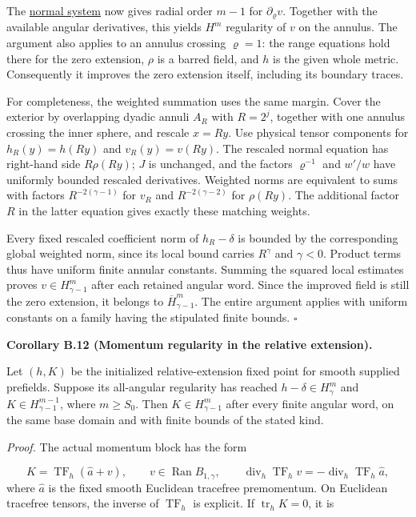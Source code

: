 \documentclass[
  english,
  11pt,
  reqno]{amsart}
\makeatletter
\newcommand{\pandocstatementheading}[1]{%
  \par\addpenalty{\@beginparpenalty}%
  \addvspace{.5\baselineskip plus .2\baselineskip minus .2\baselineskip}%
  {\normalfont\bfseries #1\par}%
  \nobreak\@afterindenttrue\@afterheading
}
\makeatother
\begin{document}
The \hyperref[eq:online-extension-momentum-normal-system]{normal system}
now gives radial order \(m-1\) for \(\partial_\varrho v\). Together with
the available angular derivatives, this yields \(H^m\) regularity of
\(v\) on the annulus. The argument also applies to an annulus crossing
\(\varrho=1\): the range equations hold there for the zero extension,
\(\rho\) is a barred field, and \(h\) is the given whole metric.
Consequently it improves the zero extension itself, including its
boundary traces.

For completeness, the weighted summation uses the same margin. Cover the
exterior by overlapping dyadic annuli \(A_R\) with \(R=2^j\), together
with one annulus crossing the inner sphere, and rescale \(x=Ry\). Use
physical tensor components for \(h_R(y)=h(Ry)\) and \(v_R(y)=v(Ry)\).
The rescaled normal equation has right-hand side \(R\rho(Ry)\); \(J\) is
unchanged, and the factors \(\varrho^{-1}\) and \(w'/w\) have uniformly
bounded rescaled derivatives. Weighted norms are equivalent to sums with
factors \(R^{-2(\gamma-1)}\) for \(v_R\) and \(R^{-2(\gamma-2)}\) for
\(\rho(Ry)\). The additional factor \(R\) in the latter equation gives
exactly these matching weights.

Every fixed rescaled coefficient norm of \(h_R-\delta\) is bounded by
the corresponding global weighted norm, since its local bound carries
\(R^\gamma\) and \(\gamma<0\). Product terms thus have uniform finite
annular constants. Summing the squared local estimates proves
\(v\in H^m_{\gamma-1}\) after each retained angular word. Since the
improved field is still the zero extension, it belongs to
\(\overline H^m_{\gamma-1}\). The entire argument applies with uniform
constants on a family having the stipulated finite bounds.
\hfill\(\square\)

\pandocstatementheading{\leavevmode{}\label{cor:online-momentum-gain-in-relative-fixed-point}Corollary B.12 (Momentum regularity in the relative extension).}

Let \((h,K)\) be the initialized relative-extension fixed point for
smooth supplied prefields. Suppose its all-angular regularity has
reached \(h-\delta\in H^m_\gamma\) and \(K\in H^{m-1}_{\gamma-1}\),
where \(m\ge S_0\). Then \(K\in H^m_{\gamma-1}\) after every finite
angular word, on the same base domain and with finite bounds of the
stated kind.

\emph{Proof.} The actual momentum block has the form

\label{eq:online-momentum-relative-range-equation} \[
K=\operatorname{TF}_h(\widehat a+v),\qquad
v\in\operatorname{Ran}B_{1,\gamma},\qquad
\operatorname{div}_h\operatorname{TF}_h v
              =-\operatorname{div}_h\operatorname{TF}_h\widehat a,
\] where \(\widehat a\) is the fixed smooth Euclidean tracefree
premomentum. On Euclidean tracefree tensors, the inverse of
\(\operatorname{TF}_h\) is explicit. If \(\operatorname{tr}_hK=0\), it
is
\end{document}
